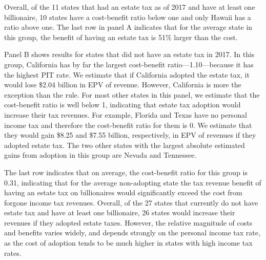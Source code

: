 \documentclass[12pt]{article}
\begin{document}
Overall,  of the 11 states that had an estate tax as of 2017 and have at least one billionaire, 10 states have a cost-benefit ratio below one and only Hawaii has a ratio above one. The last row in panel A indicates that for the average state in this group, the benefit of having an estate tax is 51\% larger than the cost. 
 
Panel B shows results for states that did not have an estate tax in 2017. In this group, California has by far the largest cost-benefit ratio---1.10---because it has the highest PIT rate. We estimate that if California adopted the estate tax, it would lose \$2.04 billion in EPV of revenue. However, California is more the exception than the rule. For most other states in this panel, we estimate that the cost-benefit ratio is well below 1, indicating that estate tax adoption would increase their tax revenues. For example, Florida and Texas have no personal income tax and therefore the cost-benefit ratio for them is 0. We estimate that they would gain \$8.25 and \$7.55 billion, respectively, in EPV of revenues if they adopted estate tax. The two other states with the largest absolute estimated gains from adoption in this group are Nevada and Tennessee. 


The last row indicates that on average, the cost-benefit ratio for this group is 0.31, indicating that for the average non-adopting state  the tax revenue benefit of having an estate tax on billionaires would significantly exceed the cost from forgone income tax revenues. 
Overall, of the 27 states that currently do not have estate tax and have at least one billionaire, 26 states would increase their revenues if they adopted estate taxes. 
However, the relative magnitude of costs and benefits varies widely, and depends strongly on the personal income tax rate, as the cost of adoption tends to be much higher in states with high income tax rates.
\end{document}
